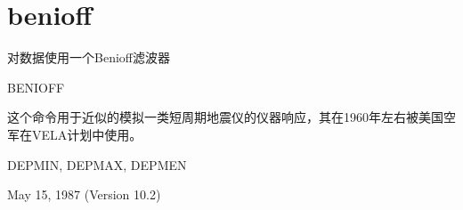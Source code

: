 \section{benioff}
\label{cmd:benioff}

对数据使用一个Benioff滤波器

BENIOFF

这个命令用于近似的模拟一类短周期地震仪的仪器响应，其在1960年左右被美国空军在VELA计划中使用。

DEPMIN, DEPMAX, DEPMEN

May 15, 1987 (Version 10.2)
